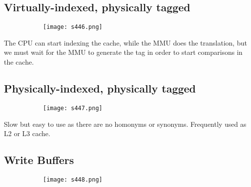 \documentclass[8pt]{extreport}
\begin{document}
\subsection{Virtually-indexed, physically tagged}

\begin{figure}[H]
\begin{subfigure}[b]{0.4\linewidth}
\texttt{[image: s446.png]}
\end{subfigure}

\end{figure}
The CPU can start indexing the cache, while the MMU does the translation, but we must wait for the MMU to generate the tag in order to start comparisons in the cache.
\subsection{Physically-indexed, physically tagged}
\begin{figure}[H]
\begin{subfigure}[b]{0.4\linewidth}
\texttt{[image: s447.png]}
\end{subfigure}
\end{figure}
Slow but easy to use as there are no homonyms or synonyms.  Frequently used as L2 or L3 cache.


\subsection{Write Buffers}
 \begin{figure}[H]
\begin{subfigure}[b]{0.4\linewidth}
\texttt{[image: s448.png]}
\end{subfigure}
\end{figure}
\end{document}
